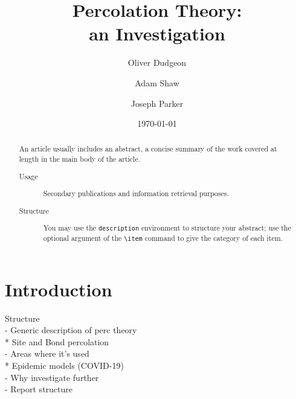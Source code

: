 \documentclass[%
 reprint,
 amsmath,amssymb,
 aps,
]{revtex4-2}
\begin{document}

\title{Percolation Theory:\\an Investigation}%

\author{Oliver Dudgeon}
\author{Adam Shaw}
\author{Joseph Parker}

\date{\today}

\begin{abstract}
An article usually includes an abstract, a concise summary of the work
covered at length in the main body of the article. 
\begin{description}
\item[Usage]
Secondary publications and information retrieval purposes.
\item[Structure]
You may use the \texttt{description} environment to structure your abstract;
use the optional argument of the \verb+\item+ command to give the category of each item. 
\end{description}
\end{abstract}

\maketitle

\section{Introduction}
Structure\\
- Generic description of perc theory \cite{stauffer_introduction_2003}\\
* Site and Bond percolation\\
- Areas where it's used\\
    * Epidemic models (COVID-19) \cite{mello_epidemics_2020}\\
- Why investigate further\\
- Report structure\\
\end{document}
